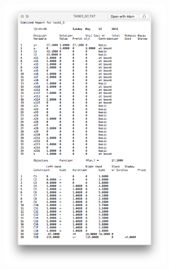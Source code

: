 \documentclass[10pt, a4paper]{article}
\begin{document}
			\begin{figure}[H]

			\centering
	            \includegraphics[width=0.75\textwidth]{res/exercise-3-c-result.png}
	        \end{figure}
\end{document}
